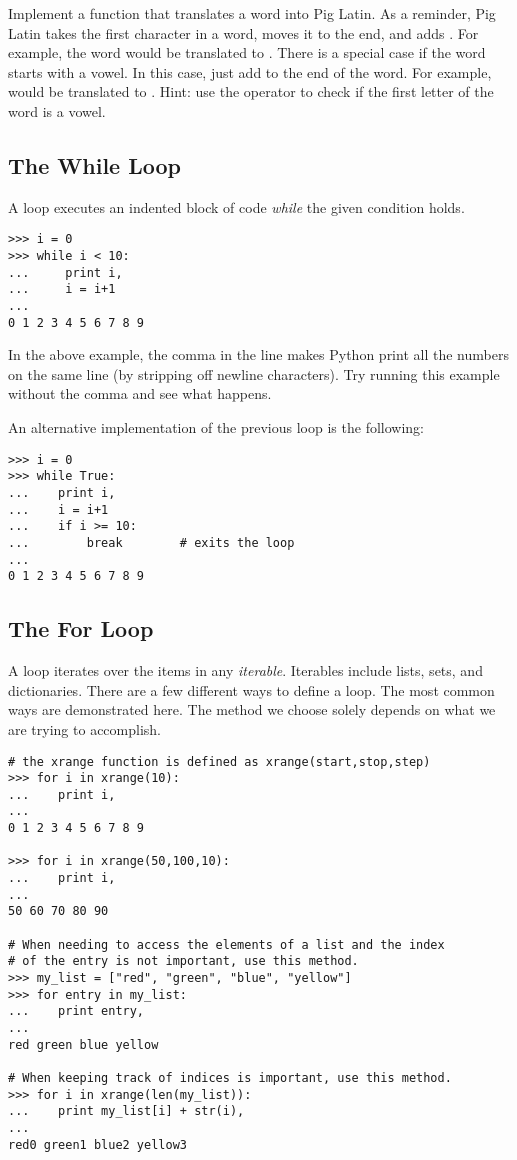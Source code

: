 \begin{problem}
Implement a function that translates a word into Pig Latin.  As a reminder, Pig Latin takes the first character in a word, moves it to the end, and adds .  For example, the word  would be translated to .  There is a special case if the word starts with a vowel.  In this case, just add  to the end of the word.  For example,  would be translated to .  Hint: use the  operator to check if the first letter of the word is a vowel.
\end{problem}

\subsection*{The While Loop}
A  loop executes an indented block of code \emph{while} the given condition holds. 

\begin{lstlisting}
>>> i = 0
>>> while i < 10:        
...     print i,            
...     i = i+1       
...     
0 1 2 3 4 5 6 7 8 9
\end{lstlisting}
In the above example, the comma in the line  makes Python print all the numbers on the same line (by stripping off newline characters). Try running this example without the comma and see what happens.

An alternative implementation of the previous  loop is the following:
\begin{lstlisting}
>>> i = 0
>>> while True:
...    print i,
...    i = i+1
...    if i >= 10:
...        break		# exits the loop
...
0 1 2 3 4 5 6 7 8 9
\end{lstlisting}

\subsection*{The For Loop}
A  loop iterates over the items in any \emph{iterable}. Iterables include lists, sets, and dictionaries.  There are a few different ways to define a  loop.  The most common ways are demonstrated here. The method we choose solely depends on what we are trying to accomplish.

\begin{lstlisting}
# the xrange function is defined as xrange(start,stop,step)
>>> for i in xrange(10):
...    print i,
...     
0 1 2 3 4 5 6 7 8 9

>>> for i in xrange(50,100,10):
...    print i,
...
50 60 70 80 90

# When needing to access the elements of a list and the index
# of the entry is not important, use this method.
>>> my_list = ["red", "green", "blue", "yellow"]
>>> for entry in my_list:
...    print entry,
...
red green blue yellow

# When keeping track of indices is important, use this method.
>>> for i in xrange(len(my_list)):
...    print my_list[i] + str(i),
...
red0 green1 blue2 yellow3
\end{lstlisting}

